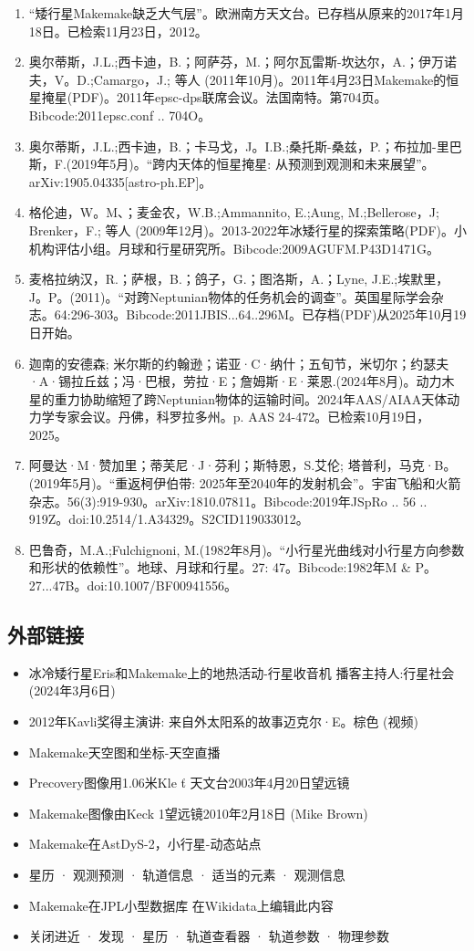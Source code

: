 \begin{enumerate}
\item “矮行星Makemake缺乏大气层”。欧洲南方天文台。已存档从原来的2017年1月18日。已检索11月23日，2012。
\item 奥尔蒂斯，J.L.;西卡迪，B.；阿萨芬，M.；阿尔瓦雷斯-坎达尔，A.；伊万诺夫，V。D.;Camargo，J.; 等人 (2011年10月)。2011年4月23日Makemake的恒星掩星(PDF)。2011年epsc-dps联席会议。法国南特。第704页。Bibcode:2011epsc.conf .. 704O。
\item 奥尔蒂斯，J.L.;西卡迪，B.；卡马戈，J。I.B.;桑托斯-桑兹，P.；布拉加-里巴斯，F.(2019年5月)。“跨内天体的恒星掩星: 从预测到观测和未来展望”。arXiv:1905.04335[astro-ph.EP]。
\item 格伦迪，W。M、；麦金农，W.B.;Ammannito, E.;Aung, M.;Bellerose，J; Brenker，F.; 等人 (2009年12月)。2013-2022年冰矮行星的探索策略(PDF)。小机构评估小组。月球和行星研究所。Bibcode:2009AGUFM.P43D1471G。
\item 麦格拉纳汉，R.；萨根，B.；鸽子，G.；图洛斯，A.；Lyne, J.E.;埃默里，J。P。(2011)。“对跨Neptunian物体的任务机会的调查”。英国星际学会杂志。64:296-303。Bibcode:2011JBIS...64..296M。已存档(PDF)从2025年10月19日开始。
\item 迦南的安德森; 米尔斯的约翰逊；诺亚·C·纳什；五旬节，米切尔；约瑟夫·A·锡拉丘兹；冯·巴根，劳拉·E；詹姆斯·E·莱恩.(2024年8月)。动力木星的重力协助缩短了跨Neptunian物体的运输时间。2024年AAS/AIAA天体动力学专家会议。丹佛，科罗拉多州。p. AAS 24-472。已检索10月19日，2025。
\item 阿曼达·M·赞加里；蒂芙尼·J·芬利；斯特恩，S.艾伦; 塔普利，马克·B。(2019年5月)。“重返柯伊伯带: 2025年至2040年的发射机会”。宇宙飞船和火箭杂志。56(3):919-930。arXiv:1810.07811。Bibcode:2019年JSpRo .. 56 .. 919Z。doi:10.2514/1.A34329。S2CID119033012。 
\item 巴鲁奇，M.A.;Fulchignoni, M.(1982年8月)。“小行星光曲线对小行星方向参数和形状的依赖性”。地球、月球和行星。27: 47。Bibcode:1982年M & P。27...47B。doi:10.1007/BF00941556。
\end{enumerate}
\subsection{外部链接}
\begin{itemize}
\item 冰冷矮行星Eris和Makemake上的地热活动-行星收音机 播客主持人:行星社会(2024年3月6日)
\item 2012年Kavli奖得主演讲: 来自外太阳系的故事迈克尔·E。棕色 (视频)
\item Makemake天空图和坐标-天空直播
\item Precovery图像用1.06米Kle ť 天文台2003年4月20日望远镜
\item Makemake图像由Keck 1望远镜2010年2月18日 (Mike Brown)
\item Makemake在AstDyS-2，小行星-动态站点
\item 星历 · 观测预测 · 轨道信息 · 适当的元素 · 观测信息
\item Makemake在JPL小型数据库 在Wikidata上编辑此内容
\item 关闭进近 · 发现 · 星历 · 轨道查看器 · 轨道参数 · 物理参数
\end{itemize}